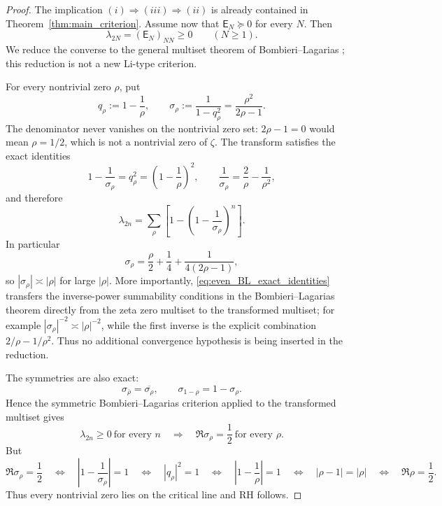 \documentclass[11pt]{amsart}
\numberwithin{equation}{section}
\theoremstyle{plain}
\theoremstyle{definition}
\theoremstyle{remark}
\newcommand{\RH}{\mathrm{RH}}
\newcommand{\E}{\mathsf E}
\begin{document}
\begin{proof}
The implication \((i)\Rightarrow(iii)\Rightarrow(ii)\) is already contained in
Theorem~\ref{thm:main_criterion}.  Assume now that \(\E_N\succeq0\) for every \(N\).  Then
\[
\lambda_{2N}=(\E_N)_{NN}\ge0
\qquad(N\ge1).
\]
We reduce the converse to the general multiset theorem of Bombieri--Lagarias
\cite[Theorem~1 and its symmetric corollary]{BombieriLagarias1999}; this reduction is not a
new Li-type criterion.

For every nontrivial zero \(\rho\), put
\[
q_\rho:=1-\frac1\rho,
\qquad
\sigma_\rho:=\frac1{1-q_\rho^2}=\frac{\rho^2}{2\rho-1}.
\label{eq:even_BL_transform}
\]
The denominator never vanishes on the nontrivial zero set: \(2\rho-1=0\) would mean
\(\rho=1/2\), which is not a nontrivial zero of \(\zeta\).  The transform satisfies the exact
identities
\begin{equation}
1-\frac1{\sigma_\rho}=q_\rho^2
=\left(1-\frac1\rho\right)^2,
\qquad
\frac1{\sigma_\rho}=\frac2\rho-\frac1{\rho^2},
\label{eq:even_BL_exact_identities}
\end{equation}
and therefore
\begin{equation}
\lambda_{2n}
=\sum_\rho\left[1-\left(1-\frac1{\sigma_\rho}\right)^n\right].
\label{eq:even_Li_as_BL_sum}
\end{equation}
In particular
\begin{equation}
\sigma_\rho
=\frac\rho2+\frac14+\frac1{4(2\rho-1)},
\label{eq:even_BL_asymptotic}
\end{equation}
so \(|\sigma_\rho|\asymp|\rho|\) for large \(|\rho|\).  More importantly,
\eqref{eq:even_BL_exact_identities} transfers the inverse-power summability conditions in the
Bombieri--Lagarias theorem directly from the zeta zero multiset to the transformed multiset; for
example \(|\sigma_\rho|^{-2}\asymp|\rho|^{-2}\), while the first inverse is the explicit
combination \(2/\rho-1/\rho^2\).  Thus no additional convergence hypothesis is being inserted in
the reduction.

The symmetries are also exact:
\begin{equation}
\sigma_{\bar\rho}=\overline{\sigma_\rho},
\qquad
\sigma_{1-\rho}=1-\sigma_\rho.
\label{eq:even_BL_symmetries}
\end{equation}
Hence the symmetric Bombieri--Lagarias criterion applied to the transformed multiset gives
\[
\lambda_{2n}\ge0\ \text{for every }n
\quad\Longrightarrow\quad
\Re\sigma_\rho=\frac12\ \text{for every }\rho.
\]
But
\[
\Re\sigma_\rho=\frac12
\quad\Longleftrightarrow\quad
\left|1-\frac1{\sigma_\rho}\right|=1
\quad\Longleftrightarrow\quad
|q_\rho|^2=1
\quad\Longleftrightarrow\quad
\left|1-\frac1\rho\right|=1
\quad\Longleftrightarrow\quad
|\rho-1|=|\rho|
\quad\Longleftrightarrow\quad
\Re\rho=\frac12.
\]
Thus every nontrivial zero lies on the critical line and \(\RH\) follows.
\end{proof}
\end{document}
